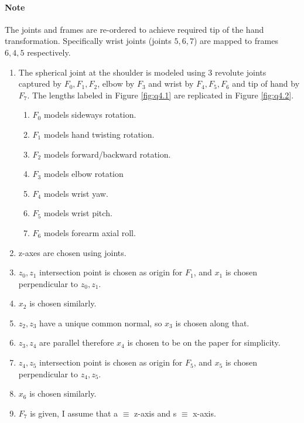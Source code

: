 \documentclass[12pt]{article}
\begin{document}
\paragraph{Note} The joints and frames are re-ordered to achieve required tip of the hand transformation. Specifically wrist joints (joints $5, 6, 7$) are mapped to frames $6, 4, 5$ respectively.
\begin{enumerate}[nolistsep]
  \item The spherical joint at the shoulder is modeled using 3 revolute joints captured by $F_0, F_1, F_2$, elbow by $F_3$ and wrist by $F_4, F_5, F_6$ and tip of hand by $F_7$. The lengths labeled in Figure \ref{fig:q4.1} are replicated in Figure \ref{fig:q4.2}.
    \begin{enumerate}[nolistsep]
      \item $F_0$ models sideways rotation.
      \item $F_1$ models hand twisting rotation.
      \item $F_2$ models forward/backward rotation.
      \item $F_3$ models elbow rotation
      \item $F_4$ models wrist yaw.
      \item $F_5$ models wrist pitch.
      \item $F_6$ models forearm axial roll.
    \end{enumerate}
  \item z-axes are chosen using joints.
  \item $z_0, z_1$ intersection point is chosen as origin for $F_1$, and $x_1$ is chosen perpendicular to $z_0, z_1$.
  \item $x_2$ is chosen similarly.
  \item $z_2, z_3$ have a unique common normal, so $x_3$ is chosen along that.
  \item $z_3, z_4$ are parallel therefore $x_4$ is chosen to be on the paper for simplicity.
  \item $z_4, z_5$ intersection point is chosen as origin for $F_5$, and $x_5$ is chosen perpendicular to $z_4, z_5$.
  \item $x_6$ is chosen similarly.
  \item $F_7$ is given, I assume that a $\equiv$ z-axis and s $\equiv$ x-axis.
\end{enumerate}
\end{document}
